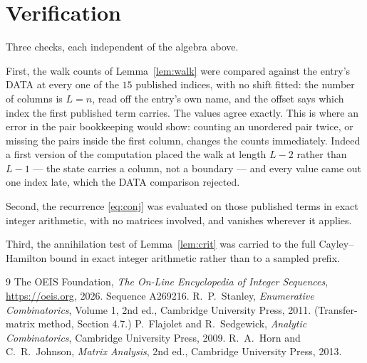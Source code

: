 \documentclass[11pt,a4paper]{article}
\theoremstyle{plain}
\theoremstyle{definition}
\begin{document}
\section{Verification}

Three checks, each independent of the algebra above.

First, the walk counts of Lemma~\ref{lem:walk} were compared against the entry's DATA at
every one of the $15$ published indices, with no shift fitted: the number of columns is
$L=n$, read off the entry's own name, and the offset says which index the first
published term carries. The values agree exactly. This is where an error in the pair
bookkeeping would show: counting an unordered pair twice, or missing the pairs inside the
first column, changes the counts immediately. Indeed a first version of the computation
placed the walk at length $L-2$ rather than $L-1$ --- the state carries a column, not a
boundary --- and every value came out one index late, which the DATA comparison rejected.

Second, the recurrence \eqref{eq:conj} was evaluated on those published terms in exact
integer arithmetic, with no matrices involved, and vanishes wherever it applies.

Third, the annihilation test of Lemma~\ref{lem:crit} was carried to the full
Cayley--Hamilton bound in exact integer arithmetic rather than to a sampled prefix.

\begin{thebibliography}{9}
 The OEIS Foundation, \emph{The On-Line Encyclopedia of Integer
Sequences}, \url{https://oeis.org}, 2026. Sequence A269216.
 R.~P.~Stanley, \emph{Enumerative Combinatorics}, Volume 1, 2nd ed.,
Cambridge University Press, 2011. (Transfer-matrix method, Section 4.7.)
 P.~Flajolet and R.~Sedgewick, \emph{Analytic Combinatorics}, Cambridge
University Press, 2009.
 R.~A.~Horn and C.~R.~Johnson, \emph{Matrix Analysis}, 2nd ed., Cambridge
University Press, 2013.
\end{thebibliography}
\end{document}
